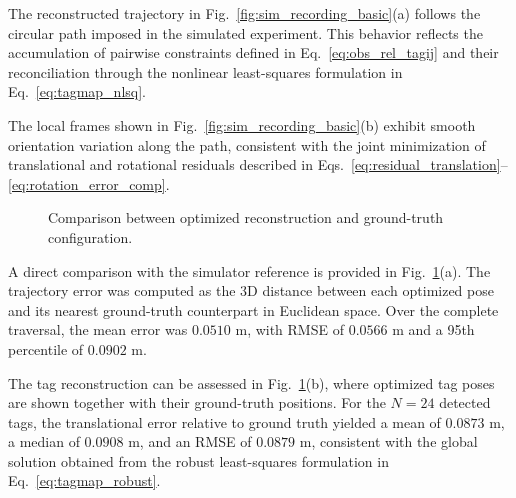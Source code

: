\documentclass[a4paper,11pt]{article}
\begin{document}
The reconstructed trajectory in Fig.~\ref{fig:sim_recording_basic}(a) follows the circular path imposed in the simulated experiment. This behavior reflects the accumulation of pairwise constraints defined in Eq.~\eqref{eq:obs_rel_tagij} and their reconciliation through the nonlinear least-squares formulation in Eq.~\eqref{eq:tagmap_nlsq}. 

The local frames shown in Fig.~\ref{fig:sim_recording_basic}(b) exhibit smooth orientation variation along the path, consistent with the joint minimization of translational and rotational residuals described in Eqs.~\eqref{eq:residual_translation}--\eqref{eq:rotation_error_comp}.

\begin{figure}[ht]
	\centering
	\begin{minipage}{0.48\linewidth}
		\centering
		
		\caption*{(a) Optimized vs Ground Truth trajectory}
	\end{minipage}
	\hfill
	\begin{minipage}{0.48\linewidth}
		\centering
		
		\caption*{(b) Optimized trajectory and tags vs Ground Truth}
	\end{minipage}
	\caption{Comparison between optimized reconstruction and ground-truth configuration.}
	\label{fig:sim_recording_comparison}
\end{figure}

A direct comparison with the simulator reference is provided in Fig.~\ref{fig:sim_recording_comparison}(a). The trajectory error was computed as the 3D distance between each optimized pose and its nearest ground-truth counterpart in Euclidean space. Over the complete traversal, the mean error was $0.0510\text{ m}$, with RMSE of $0.0566\text{ m}$ and a 95th percentile of $0.0902\text{ m}$.

The tag reconstruction can be assessed in Fig.~\ref{fig:sim_recording_comparison}(b), where optimized tag poses are shown together with their ground-truth positions. For the $N=24$ detected tags, the translational error relative to ground truth yielded a mean of $0.0873\text{ m}$, a median of $0.0908\text{ m}$, and an RMSE of $0.0879\text{ m}$, consistent with the global solution obtained from the robust least-squares formulation in Eq.~\eqref{eq:tagmap_robust}.
\end{document}
